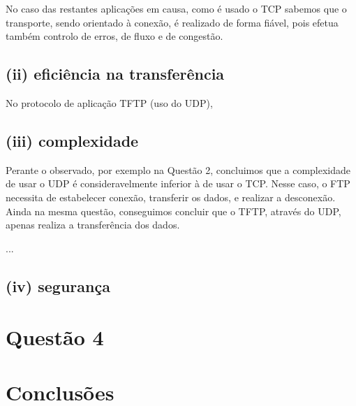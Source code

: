 \documentclass{llncs}
\begin{document}
No caso das restantes aplicações em causa, como é usado o TCP sabemos que o transporte, sendo orientado à conexão, é realizado de forma fiável, pois efetua também controlo de erros, de fluxo e de congestão.

\subsection{(ii) eficiência na transferência}
No protocolo de aplicação TFTP (uso do UDP),

\subsection{(iii) complexidade}
Perante o observado, por exemplo na Questão 2, concluimos que a complexidade de usar o UDP é consideravelmente inferior à de usar o TCP. Nesse caso, o FTP necessita de estabelecer conexão, transferir os dados, e realizar a desconexão. Ainda na mesma questão, conseguimos concluir que o TFTP, através do UDP, apenas realiza a transferência dos dados.

...

\subsection{(iv) segurança}


\section{Questão 4}

\section{Conclusões}
\end{document}
